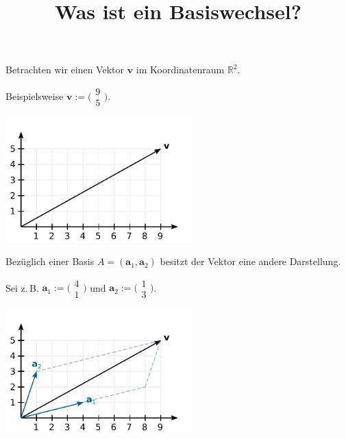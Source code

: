 \documentclass[9pt]{beamer}
\title{Was ist ein Basiswechsel?}
\date{}
\newcommand{\bv}[1]{\mathbf{#1}}
\newcommand{\R}{\mathbb R}
\newcommand{\icol}[1]{
  \big(\!\begin{smallmatrix}#1\end{smallmatrix}\!\big)%
}
\newcommand{\parspace}{\vspace{0.8em}}
\begin{document}
\begin{frame}
\maketitle
\end{frame}

\begin{frame}[t]
\vspace{3em}
Betrachten wir einen Vektor $\bv v$ im Koordinatenraum $\R^2$.

\parspace
Beispielsweise $\bv v:=\icol{9\\ 5}$.\pause

\vspace{-1em}
\begin{center}
\includegraphics[width=72mm]{img/Vektor.pdf}
\end{center}
\end{frame}

\begin{frame}[t]
\vspace{3em}
Bezüglich einer Basis $A=(\bv a_1,\bv a_2)$ besitzt der
Vektor eine andere Darstellung.\pause

\parspace
Sei z.\,B. $\bv a_1 := \icol{4\\ 1}$ und $\bv a_2 := \icol{1\\ 3}$.%
\pause

\vspace{-1.6em}
\begin{center}
\includegraphics[width=72mm]{img/Vektor-in-Basis-A.pdf}
\end{center}
\end{frame}
\end{document}
